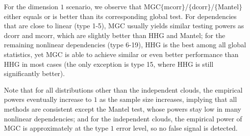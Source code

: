 \documentclass[11pt]{article}
\begin{document}
For the dimension $1$ scenario, we observe that MGC$\{$mcorr$\}$/$\{$dcorr$\}$/$\{$Mantel$\}$ either equals or is better than its corresponding global test. For dependencies that are close to linear (type 1-5), MGC usually yields similar testing powers as dcorr and mcorr, which are slightly better than HHG and Mantel; for the remaining nonlinear dependencies (type 6-19), HHG is the best among all global statistics, yet MGC is able to achieve similar or even better performance than HHG in most cases (the only exception is type 15, where HHG is still significantly better). 

Note that for all distributions other than the independent clouds, the empirical powers eventually increase to $1$ as the sample size increases, implying that all methods are consistent except the Mantel test, whose powers stay low in many nonlinear dependencies; and for the independent clouds, the empirical power of MGC is approximately at the type $1$ error level, so no false signal is detected. 
\end{document}
